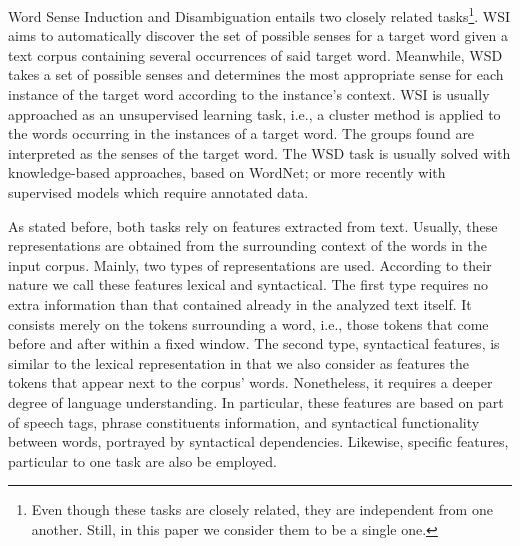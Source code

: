 \documentclass{llncs}
\begin{document}
Word Sense Induction and Disambiguation entails two closely related tasks\footnote{Even though these tasks are closely related, they are independent from one another. Still, in this paper we consider them to be a single one.}. WSI aims to automatically discover the set of possible senses for a target word given a text corpus containing several occurrences of said target word. Meanwhile, WSD takes a set of possible senses and determines the most appropriate sense for each instance of the target word according to the instance's context. WSI is usually approached as an unsupervised learning task, i.e., a cluster method is applied to the words occurring in the instances of a target word. The groups found are interpreted as the senses of the target word. The WSD task is usually solved with knowledge-based approaches, based on WordNet; or more recently with supervised models which require annotated data.

As stated before, both tasks rely on features extracted from text. Usually, these representations are obtained from the surrounding context of the words in the  input corpus. Mainly,  two types of representations are used. According to their nature we call these features lexical and syntactical. 	The first type requires no extra information than that contained already in the analyzed text itself. It consists merely on the tokens surrounding a word, i.e., those tokens that come before and after within a fixed window. The second type, syntactical features, is similar to the lexical representation in that we also consider as features the tokens that appear next to the corpus' words. Nonetheless, it requires a deeper degree of language understanding. In particular, these features are based on part of speech tags, phrase constituents information, and syntactical functionality between words, portrayed by syntactical dependencies. Likewise, specific features, particular to one task are also be employed.


\end{document}
